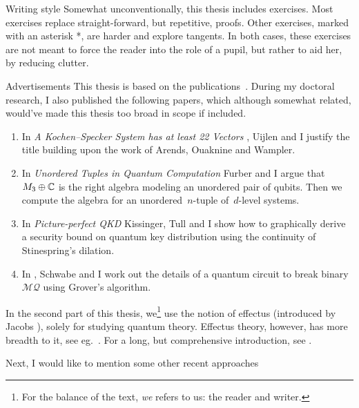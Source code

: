 \begin{parsec}
\begin{point}{Writing style}
Somewhat unconventionally, this thesis includes exercises.
Most exercises replace straight-forward, but repetitive, proofs.
Other exercises, marked with an asterisk *,
    are harder and explore tangents.
In both cases, these exercises are not meant to force the reader into the
    role of a pupil, but rather to aid her, by reducing clutter.
\end{point}
\begin{point}{Advertisements}%
This thesis is based on the publications~\cite{wwpaschke,westerbaan2016universal,cho2015quotient,statesofconvexsets}.
During my doctoral research,
    I also published the following papers,
    which although somewhat related,
    would've made this thesis too broad in scope if included.
\begin{enumerate}
    \item In \emph{A Kochen--Specker System has at least 22 Vectors} \cite{uijlen2016kochen},
        Uijlen and I justify the title building upon the work
        of Arends, Ouaknine and Wampler.
\item 
    In \emph{Unordered Tuples in Quantum Computation} \cite{bags}
        Furber and I argue that~$M_3 \oplus \mathbb{C}$ is the right algebra
        modeling an unordered pair of qubits.  Then we compute
        the algebra for an unordered~$n$-tuple of~$d$-level systems.
\item
    In \emph{Picture-perfect QKD} \cite{kissinger2017picture}
        Kissinger, Tull and I show how to graphically derive a security
        bound on quantum key distribution using the continuity of Stinespring's dilation.
\item
    In \cite{schwabe2016solving}, Schwabe and I
            work out the details of a quantum circuit
            to break binary~$\mathcal{MQ}$ using Grover's algorithm.
\end{enumerate}
In the second part of this thesis,
    we\footnote{%
        For the balance of the text,
        \emph{we} refers to us: the reader and writer.}
 use the notion of effectus (introduced by Jacobs \cite{newdirections}),
    solely for studying quantum theory.
Effectus theory, however, has more breadth to it,
 see eg.~\cite{jacobs2017quantum,
cho2017disintegration,
adams2015type,
jacobs2016hyper,
jacobs2017channel,
jacobs2017formal,
cho2017efprob,
jacobs2017probability,
jacobs2017recipe,
jacobs2016effectuses,
jacobs2016affine,
jacobs2017distances,
jacobs2015effect}.
For a long, but comprehensive introduction, see \cite{effintro}.
\begin{point}%
Next, I would like to mention some other recent approaches

\end{point}
\end{point}
\end{parsec}
